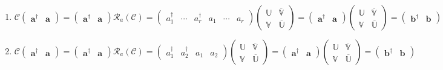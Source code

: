 \documentclass[aps,preprint]{revtex4}
\begin{document}
\begin{enumerate}
\item 
\begin{equation}
\mathcal{C}\left( 
\begin{array}{cc}
\boldsymbol{a}^{\dagger } & \boldsymbol{a}%
\end{array}%
\right) =\left( 
\begin{array}{cc}
\boldsymbol{a}^{\dagger } & \boldsymbol{a}%
\end{array}%
\right) \mathcal{R}_{a}\left( \mathcal{C}\right) =\left( 
\begin{array}{cccccc}
a_{1}^{\dagger } & \cdots & a_{r}^{\dagger } & a_{1} & \cdots & a_{r}%
\end{array}%
\right) \left( 
\begin{array}{cc}
\mathbb{U} & \overline{\mathbb{V}} \\ 
\mathbb{V} & \overline{\mathbb{U}}%
\end{array}%
\right) =\left( 
\begin{array}{cc}
\boldsymbol{a}^{\dagger } & \boldsymbol{a}%
\end{array}%
\right) \left( 
\begin{array}{cc}
\mathbb{U} & \overline{\mathbb{V}} \\ 
\mathbb{V} & \overline{\mathbb{U}}%
\end{array}%
\right) =\left( 
\begin{array}{cc}
\boldsymbol{b}^{\dagger } & \boldsymbol{b}%
\end{array}%
\right)
\end{equation}

\item 
\begin{equation}
\mathcal{C}\left( 
\begin{array}{cc}
\boldsymbol{a}^{\dagger } & \boldsymbol{a}%
\end{array}%
\right) =\left( 
\begin{array}{cc}
\boldsymbol{a}^{\dagger } & \boldsymbol{a}%
\end{array}%
\right) \mathcal{R}_{a}\left( \mathcal{C}\right) =\left( 
\begin{array}{cccc}
a_{1}^{\dagger } & a_{2}^{\dagger } & a_{1} & a_{2}%
\end{array}%
\right) \left( 
\begin{array}{cc}
\mathbb{U} & \overline{\mathbb{V}} \\ 
\mathbb{V} & \overline{\mathbb{U}}%
\end{array}%
\right) =\left( 
\begin{array}{cc}
\boldsymbol{a}^{\dagger } & \boldsymbol{a}%
\end{array}%
\right) \left( 
\begin{array}{cc}
\mathbb{U} & \overline{\mathbb{V}} \\ 
\mathbb{V} & \overline{\mathbb{U}}%
\end{array}%
\right) =\left( 
\begin{array}{cc}
\boldsymbol{b}^{\dagger } & \boldsymbol{b}%
\end{array}%
\right)
\end{equation}


\end{enumerate}
\end{document}
